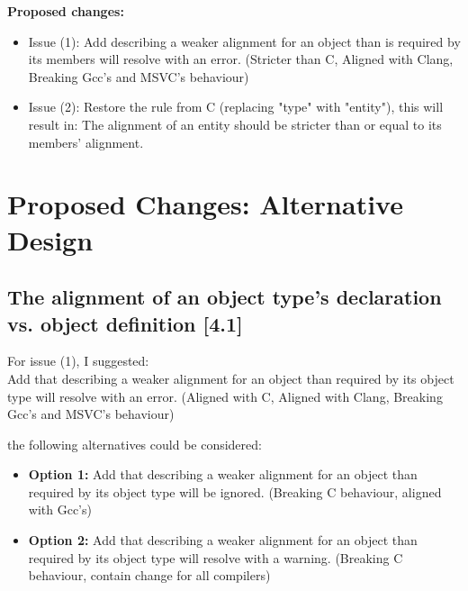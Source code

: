 \documentclass[11pt]{article}
\begin{document}
\textbf{Proposed changes:}

\begin{itemize}

    \item Issue (1): Add describing a weaker alignment for an object than is required by its members will resolve with an error. (Stricter than C, Aligned with Clang, Breaking Gcc's and MSVC's behaviour)
    
    \item Issue (2): Restore the rule from C (replacing "type" with "entity"), this will result in: The alignment of an entity should be stricter than or equal to its members' alignment. 

    
\end{itemize}

\section{Proposed Changes: Alternative Design}

\subsection{The alignment of an object type's declaration vs. object definition [4.1]}

For issue (1), I suggested: \\
Add that describing a weaker alignment for an object than required by its object type will resolve with an error. (Aligned with C, Aligned with Clang, Breaking Gcc's and MSVC's behaviour)

the following alternatives could be considered:
\begin{itemize}
    \item \textbf{Option 1:} Add that describing a weaker alignment for an object than required by its object type will be ignored. (Breaking C behaviour, aligned with Gcc's)
    
    \item \textbf{Option 2:} Add that describing a weaker alignment for an object than required by its object type will resolve with a warning. (Breaking C behaviour, contain change for all compilers)
\end{itemize}
\end{document}
